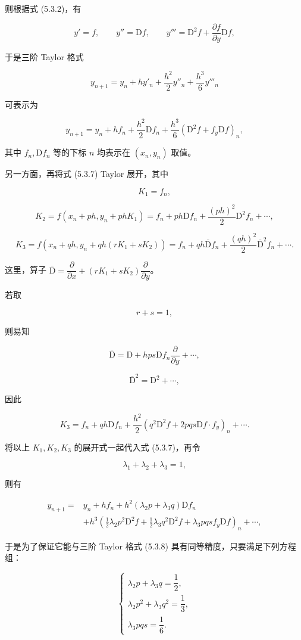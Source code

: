 \documentclass[
  10pt,
  fontset=fandol]{ctexart}
\begin{document}
则根据式 (5.3.2)，有

\[
y'=f,\qquad y''=\mathrm Df,\qquad y'''=\mathrm D^2f+\frac{\partial f}{\partial y}\mathrm Df,
\]

于是三阶 Taylor 格式

\[
y_{n+1}=y_n+hy'_n+\frac{h^2}{2}y''_n+\frac{h^3}{6}y'''_n
\]

可表示为

\[
y_{n+1}=y_n+hf_n+\frac{h^2}{2}\mathrm Df_n+\frac{h^3}{6}(\mathrm D^2f+f_y\mathrm Df)_n,\tag{5.3.8}
\]

其中 \(f_n,\mathrm Df_n\) 等的下标 \(n\) 均表示在 \((x_n,y_n)\) 取值。

另一方面，再将式 (5.3.7) Taylor 展开，其中

\[
K_1=f_n,
\]

\[
K_2=f(x_n+ph,y_n+phK_1)=f_n+ph\mathrm Df_n+\frac{(ph)^2}{2}\mathrm D^2f_n+\cdots,
\]

\[
K_3=f(x_n+qh,y_n+qh(rK_1+sK_2))=f_n+qh\overline{\mathrm D}f_n+\frac{(qh)^2}{2}\overline{\mathrm D}^{2}f_n+\cdots.
\]

这里，算子 \(\overline{\mathrm D}=\dfrac{\partial}{\partial x}+(rK_1+sK_2)\dfrac{\partial}{\partial y}\)。

若取

\[
r+s=1,\tag{5.3.9}
\]

则易知

\[
\overline{\mathrm D}=\mathrm D+hps\mathrm Df_n\frac{\partial}{\partial y}+\cdots,\tag{5.3.10}
\]

\[
\overline{\mathrm D}^{2}=\mathrm D^2+\cdots,
\]

因此

\[
K_3=f_n+qh\mathrm Df_n+\frac{h^2}{2}(q^2\mathrm D^2f+2pqs\mathrm Df\cdot f_y)_n+\cdots.
\]

将以上 \(K_1,K_2,K_3\) 的展开式一起代入式 (5.3.7)，再令

\[
\lambda_1+\lambda_2+\lambda_3=1,\tag{5.3.11}
\]

则有

\[
\begin{aligned}
y_{n+1}={}&y_n+hf_n+h^2(\lambda_2p+\lambda_3q)\mathrm Df_n\\
&+h^3\left(\frac12\lambda_2p^2\mathrm D^2f+\frac12\lambda_3q^2\mathrm D^2f+\lambda_3pqsf_y\mathrm Df\right)_n+\cdots,
\end{aligned}
\]

于是为了保证它能与三阶 Taylor 格式 (5.3.8) 具有同等精度，只要满足下列方程组：

\[
\begin{cases}
\lambda_2p+\lambda_3q=\dfrac12,\\
\lambda_2p^2+\lambda_3q^2=\dfrac13,\\
\lambda_3pqs=\dfrac16.
\end{cases}\tag{5.3.12}
\]
\end{document}
